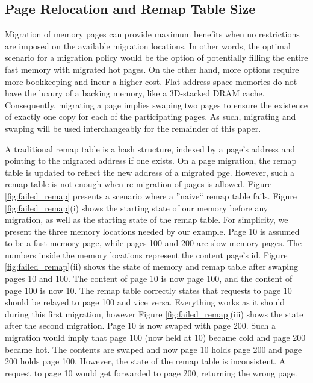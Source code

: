 \subsection{Page Relocation and Remap Table Size}
\label{sec:relocation}

Migration of memory pages can provide maximum benefits when no restrictions are imposed on the available migration locations. In other words, the optimal scenario for a migration policy would be the option of potentially filling the entire fast memory with migrated hot pages. On the other hand, more options require more bookkeeping and incur a higher cost. Flat address space memories do not have the luxury of a backing memory, like a 3D-stacked DRAM cache. Consequently, migrating a page implies swaping two pages to ensure the existence of exactly one copy for each of the participating pages. As such, migrating and swaping will be used interchangeably for the remainder of this paper.

A traditional remap table is a hash structure, indexed by a page's address and pointing to the migrated address if one exists. On a page migration, the remap table is updated to reflect the new address of a migrated pge. However, such a remap table is not enough when re-migration of pages is allowed. Figure \ref{fig:failed_remap} presents a scenario where a ''naive`` remap table fails. Figure \ref{fig:failed_remap}(i) shows the starting state of our memory before any migration, as well as the starting state of the remap table. For simplicity, we present the three memory locations needed by our example. Page 10 is assumed to be a fast memory page, while pages 100 and 200 are slow memory pages. The numbers inside the memory locations represent the content page's id. Figure \ref{fig:failed_remap}(ii) shows the state of memory and remap table after swaping pages 10 and 100. The content of page 10 is now page 100, and the content of page 100 is now 10. The remap table correctly states that requests to page 10 should be relayed to page 100 and vice versa.  Everything works as it should during this first migration, however Figure \ref{fig:failed_remap}(iii) shows the state after the second migration. Page 10 is now swaped with page 200. Such a migration would imply that page 100 (now held at 10) became cold and page 200 became hot. The contents are swaped and now page 10 holds page 200 and page 200 holds page 100. However, the state of the remap table is inconsistent. A request to page 10 would get forwarded to page 200, returning the wrong page.

